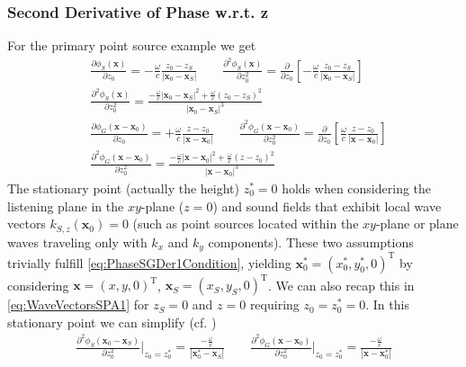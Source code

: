 \documentclass[a4paper,BCOR=15mm,10pt,twoside]{scrartcl}
\newcommand\wc{\frac{\omega}{c}}  %
\renewcommand{\vec}[1]{\mathbf{#1}}  %
\begin{document}
\subsubsection{Second Derivative of Phase w.r.t. z}
For the primary point source example we get
\begin{align}
&\frac{\partial \phi_{S}(\vec{x})}{\partial z_0} = - \wc \frac{z_0-z_S}{|\vec{x}_0-\vec{x}_S|}\qquad
\frac{\partial^2 \phi_{S}(\vec{x})}{\partial z_0^2} = \frac{\partial}{\partial z_0}[- \wc \frac{z_0-z_S}{|\vec{x}_0-\vec{x}_S|}]\\
&\frac{\partial^2 \phi_{S}(\vec{x})}{\partial z_0^2} = \frac{-\wc |\vec{x}_0-\vec{x}_S|^2 + \wc (z_0-z_S)^2}{|\vec{x}_0-\vec{x}_S|^3}\\
&\frac{\partial \phi_{G}(\vec{x}-\vec{x}_0)}{\partial z_0} = +\wc \frac{z-z_0}{|\vec{x}-\vec{x}_0|}\qquad
\frac{\partial^2 \phi_{G}(\vec{x}-\vec{x}_0)}{\partial z_0^2} = \frac{\partial}{\partial z_0}[\wc \frac{z-z_0}{|\vec{x}-\vec{x}_0|}]\\
&\frac{\partial^2 \phi_{G}(\vec{x}-\vec{x}_0)}{\partial z_0^2} = \frac{-\wc |\vec{x}-\vec{x}_0|^2 + \wc (z-z_0)^2}{|\vec{x}-\vec{x}_0|^3}
\end{align}
The stationary point (actually the height) $z_0^* = 0$ holds when considering the listening plane in the $xy$-plane ($z=0$) and sound fields that exhibit local wave vectors $k_{S,z}(\vec{x}_0) = 0$ (such as point sources located within the $xy$-plane or plane waves traveling only with $k_x$ and $k_y$ components).
These two assumptions trivially fulfill \eqref{eq:PhaseSGDer1Condition}, yielding $\vec{x}_0^*=(x_0^*,y_0^*,0)^\mathrm{T}$ by considering $\vec{x}=(x,y,0)^\mathrm{T}$, $\vec{x}_S=(x_S,y_S,0)^\mathrm{T}$.
We can also recap this in \eqref{eq:WaveVectorsSPA1} for $z_S=0$ and $z=0$ requiring $z_0=z_0^*=0$.
In this stationary point we can simplify (cf. \cite[eq. (10)ff]{Firtha2018})
\begin{align}
\label{eq:phizz}
\frac{\partial^2 \phi_{S}(\vec{x}_0-\vec{x}_S)}{\partial z_0^2}\bigg|_{z_0=z_0^*} = \frac{-\wc}{|\vec{x}_0^*-\vec{x}_S|}\qquad
\frac{\partial^2 \phi_{G}(\vec{x}-\vec{x}_0)}{\partial z_0^2}\bigg|_{z_0=z_0^*} = \frac{-\wc}{|\vec{x}-\vec{x}_0^*|}
\end{align}
\end{document}
